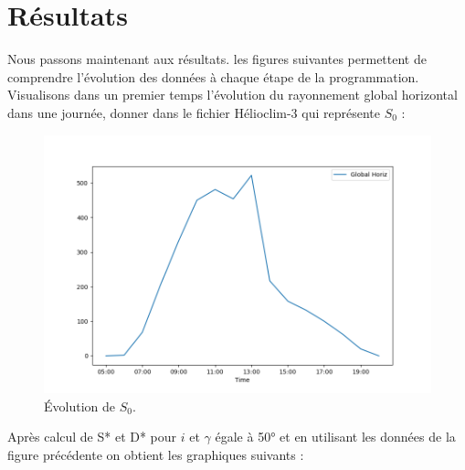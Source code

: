 \documentclass[12pt,a4paper,openright]{report}
\begin{document}
\section{Résultats}
Nous passons maintenant aux résultats. les figures suivantes permettent de comprendre l'évolution des données à chaque étape de la programmation. Visualisons dans un premier temps l'évolution du rayonnement global horizontal dans une journée, donner dans le fichier Hélioclim-3 qui représente $S_0$ :

\begin{figure}[h!]
\begin{center}
\includegraphics[scale=0.4]{figSolarglob}
\caption{Évolution de $S_0$.}
\end{center}
\end{figure}

Après calcul de S* et D* pour $i$ et $\gamma$ égale à 50° et en utilisant les données de la figure précédente on obtient les graphiques suivants :
\end{document}
